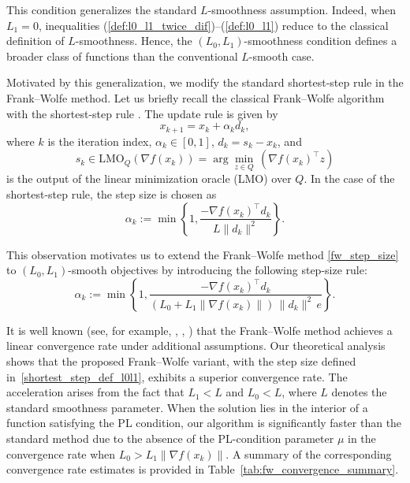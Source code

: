 \documentclass[runningheads]{llncs}
\begin{document}
	This condition generalizes the standard $L$-smoothness assumption. Indeed, when $L_1 = 0$, inequalities (\ref{def:l0_l1_twice_dif})–(\ref{def:l0_l1}) reduce to the classical definition of $L$-smoothness. Hence, the $(L_0, L_1)$-smoothness condition defines a broader class of functions than the conventional $L$-smooth case. 
	
	Motivated by this generalization, we modify the standard shortest-step rule in the Frank–Wolfe method. Let us briefly recall the classical Frank–Wolfe algorithm \cite{frank1956algorithm} with the shortest-step rule \cite{levitin1966constrained}. The update rule is given by
	\begin{equation}\label{fw_step_size}
		x_{k+1} = x_k + \alpha_k d_k,
	\end{equation}
	where $k$ is the iteration index, $\alpha_k \in [0, 1]$, $d_k = s_k - x_k$, and 
	\begin{equation}\label{lmo}
		s_k \in \mathrm{LMO}_Q(\nabla f(x_k)) = \arg\min_{z \in Q} \, (\nabla f(x_k)^\top z)
	\end{equation}
	is the output of the linear minimization oracle (LMO) over $Q$. In the case of the shortest-step rule, the step size is chosen as
	\begin{equation}\label{shortest_step_def}
		\alpha_k := \min \left\{ 1, \frac{-\nabla f(x_k)^\top d_k}{L \| d_k \|^2} \right\}.
	\end{equation}
	
	This observation motivates us to extend the Frank–Wolfe method \eqref{fw_step_size} to $(L_0, L_1)$-smooth objectives by introducing the following step-size rule:
	\begin{equation}\label{shortest_step_def_l0l1}
		\alpha_k := \min \left\{ 1, 
		\frac{- \nabla f(x_k)^\top d_k}{(L_0 + L_1 \| \nabla f(x_k)\|) \, \|d_k\|^2 \, e} \right\}.
	\end{equation}
	
	It is well known (see, for example, \cite{braun2022conditional}, \cite{bomze2021frank}, \cite{levitin1966constrained}) that the Frank–Wolfe method achieves a linear convergence rate under additional assumptions. Our theoretical analysis shows that the proposed Frank–Wolfe variant, with the step size defined in~\eqref{shortest_step_def_l0l1}, exhibits a superior convergence rate. The acceleration arises from the fact that $L_1 < L$ and $L_0 < L$, where $L$ denotes the standard smoothness parameter. When the solution lies in the interior of a function satisfying the PL condition, our algorithm is significantly faster than the standard method due to the absence of the PL-condition parameter $\mu$ in the convergence rate when $L_0 > L_1 \| \nabla f(x_k) \|$. A summary of the corresponding convergence rate estimates is provided in Table~\ref{tab:fw_convergence_summary}.
	
\end{document}
